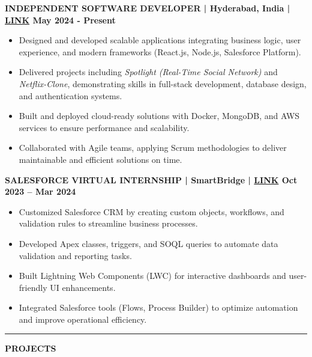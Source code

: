 \documentclass[11pt,a4paper]{article}
\newcommand{\link}[1]{\href{#1}{LINK}}
\newcommand{\resumesection}[1]{
	\vspace{0.2cm}
	\hrule
	\vspace{0.2cm}
	\centerline{\large\textbf{#1}}
	\vspace{0.15cm}
}
\begin{document}
	\noindent \textbf{INDEPENDENT SOFTWARE DEVELOPER | Hyderabad, India | \link{https://github.com/ValupadasuSaiAbbhiram} \hfill{May 2024 - Present}} 
	\begin{itemize}
		\item Designed and developed scalable applications integrating business logic, user experience, and modern frameworks (React.js, Node.js, Salesforce Platform).
		\item Delivered projects including \textit{Spotlight (Real-Time Social Network)} and \textit{Netflix-Clone}, demonstrating skills in full-stack development, database design, and authentication systems.
		\item Built and deployed cloud-ready solutions with Docker, MongoDB, and AWS services to ensure performance and scalability.
		\item Collaborated with Agile teams, applying Scrum methodologies to deliver maintainable and efficient solutions on time.
	\end{itemize}
	\vspace{0.1cm}
	\textbf{SALESFORCE VIRTUAL INTERNSHIP | SmartBridge | \link{https://www.salesforce.com/trailblazer/svalupadasu} \hfill{Oct 2023 -- Mar 2024}} 
	\begin{itemize}
		\item Customized Salesforce CRM by creating custom objects, workflows, and validation rules to streamline business processes.
		\item Developed Apex classes, triggers, and SOQL queries to automate data validation and reporting tasks.
		\item Built Lightning Web Components (LWC) for interactive dashboards and user-friendly UI enhancements.
		\item Integrated Salesforce tools (Flows, Process Builder) to optimize automation and improve operational efficiency.
	\end{itemize}
	
	
	\resumesection{PROJECTS}
	
\end{document}

